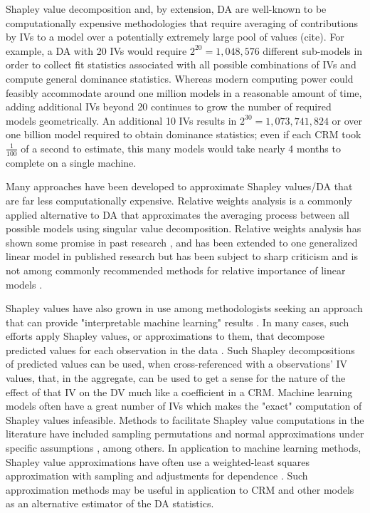 \documentclass[ShortAfour,times,sageapa]{sagej}
\begin{document}
	Shapley value decomposition and, by extension, DA are well-known to be computationally expensive methodologies that require averaging of contributions by IVs to a model over a potentially extremely large pool of values (cite).
	For example, a DA with 20 IVs would require $2^{20} = 1,048,576$ different sub-models in order to collect fit statistics associated with all possible combinations of IVs and compute general dominance statistics.
	Whereas modern computing power could feasibly accommodate around one million models in a reasonable amount of time, adding additional IVs beyond 20 continues to grow the number of required models geometrically. 
	An additional 10 IVs results in $2^{30} = 1,073,741,824$ or over one billion model required to obtain dominance statistics; even if each CRM took $\frac{1}{100}$ of a second to estimate, this many models would take nearly 4 months to complete on a single machine.
	
	Many approaches have been developed to approximate Shapley values/DA that are far less computationally expensive. 
	Relative weights analysis \cite{johnson2000heuristic} is a commonly applied alternative to DA that approximates the averaging process between all possible models using singular value decomposition.
	Relative weights analysis has shown some promise in past research \cite{lebreton2007multidimensional}, and has been extended to one generalized linear model in published research \cite[i.e., logit regression]{tonidandel2011relative} but has been subject to sharp criticism \cite{thomas2014johnson} and is not among commonly recommended methods for relative importance of linear models \cite{gromping2007estimators}. 
		
	Shapley values have also grown in use among methodologists seeking an approach that can provide "interpretable machine learning" results \cite[see]{molnar2020interpretable}.
	In many cases, such efforts apply Shapley values, or approximations to them, that decompose predicted values for each observation in the data \cite[e.g., ]{lundberg2020local}.
	Such Shapley decompositions of predicted values can be used, when cross-referenced with a observations' IV values, that, in the aggregate, can be used to get a sense for the nature of the effect of that IV on the DV much like a coefficient in a CRM.
	Machine learning models often have a great number of IVs which makes the "exact" computation of Shapley values infeasible.
	Methods to facilitate Shapley value computations in the literature have included sampling permutations \cite{castro2009polynomial} and normal approximations under specific assumptions \cite{fatima2008linear}, among others.
	In application to machine learning methods, Shapley value approximations have often use a weighted-least squares approximation with sampling and adjustments for dependence \cite[see]{sellereite2020shapr,aas2021explaining}. 
	Such approximation methods may be useful in application to CRM and other models as an alternative estimator of the DA statistics.
	
\end{document}

